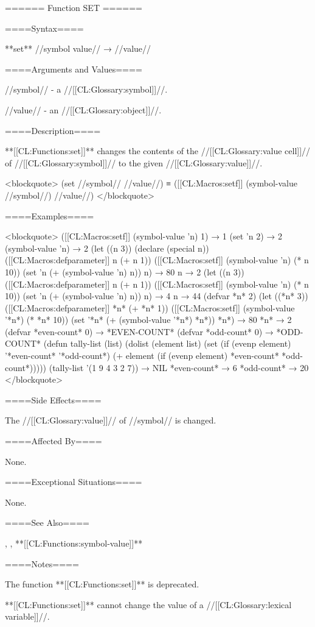 ====== Function SET ======

====Syntax====

**set** //symbol value// → //value//

====Arguments and Values====

//symbol// - a //[[CL:Glossary:symbol]]//.

//value// - an //[[CL:Glossary:object]]//.

====Description====

**[[CL:Functions:set]]** changes the contents of the //[[CL:Glossary:value cell]]// of //[[CL:Glossary:symbol]]// to the given //[[CL:Glossary:value]]//.

<blockquote> (set //symbol// //value//) ≡ ([[CL:Macros:setf]] (symbol-value //symbol//) //value//) </blockquote>

====Examples====

<blockquote> ([[CL:Macros:setf]] (symbol-value 'n) 1) → 1 (set 'n 2) → 2 (symbol-value 'n) → 2 (let ((n 3)) (declare (special n)) ([[CL:Macros:defparameter]] n (+ n 1)) ([[CL:Macros:setf]] (symbol-value 'n) (* n 10)) (set 'n (+ (symbol-value 'n) n)) n) → 80 n → 2 (let ((n 3)) ([[CL:Macros:defparameter]] n (+ n 1)) ([[CL:Macros:setf]] (symbol-value 'n) (* n 10)) (set 'n (+ (symbol-value 'n) n)) n) → 4 n → 44 (defvar *n* 2) (let ((*n* 3)) ([[CL:Macros:defparameter]] *n* (+ *n* 1)) ([[CL:Macros:setf]] (symbol-value '*n*) (* *n* 10)) (set '*n* (+ (symbol-value '*n*) *n*)) *n*) → 80 *n* → 2 (defvar *even-count* 0) → *EVEN-COUNT* (defvar *odd-count* 0) → *ODD-COUNT* (defun tally-list (list) (dolist (element list) (set (if (evenp element) '*even-count* '*odd-count*) (+ element (if (evenp element) *even-count* *odd-count*))))) (tally-list '(1 9 4 3 2 7)) → NIL *even-count* → 6 *odd-count* → 20 </blockquote>

====Side Effects====

The //[[CL:Glossary:value]]// of //symbol// is changed.

====Affected By====

None.

====Exceptional Situations====

None.

====See Also====

, , **[[CL:Functions:symbol-value]]**

====Notes====

The function **[[CL:Functions:set]]** is deprecated.

**[[CL:Functions:set]]** cannot change the value of a //[[CL:Glossary:lexical variable]]//.

